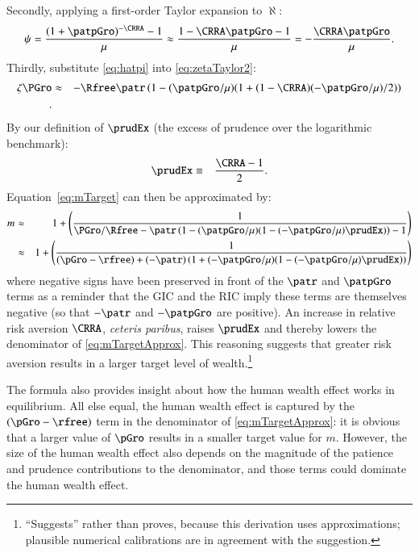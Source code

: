Secondly, applying a first-order Taylor expansion to $\aleph$:
\begin{eqnarray}
\label{eq:hatpi}
\aleph = \frac{(1+\patpGro)^{-\CRRA}-1}{\urate} 
\approx \frac{1- \CRRA \patpGro-1}{\urate}
= -\frac{\CRRA \patpGro}{\urate}
.
\end{eqnarray}
Thirdly, substitute \eqref{eq:hatpi} into \eqref{eq:zetaTaylor2}:
\begin{eqnarray}
  \zeta\PGro 
& \approx &  
-\Rfree \patr \left(1-(\patpGro/\urate)(1+(1-\CRRA)(-\patpGro/\urate)/2)\right)\\ 
\label{eq:zetaGammaApprox}
.
\end{eqnarray}
By our definition of $\prudEx$ (the excess of prudence over the logarithmic benchmark):
\begin{eqnarray}
  \prudEx & \equiv & \frac{\CRRA-1}{2}%
.   \notag
\end{eqnarray}
Equation~\eqref{eq:mTarget} can then be approximated by:
\begin{eqnarray}
 \mTarg^{\null} & \approx & 1 + \left(\frac{1}{\PGro/\Rfree-\patr \left(1-(\patpGro/\urate)(1-(-\patpGro/\urate)\prudEx) \right)-1}\right) \notag
\\ & \approx & 1 + \left(\frac{1}{(\pGro-\rfree)+(-\patr) \left(1+(-\patpGro/\urate)(1-(-\patpGro/\urate)\prudEx)\right)}\right)
\label{eq:mTargetApprox}
\end{eqnarray}
where negative signs have been preserved in front of the $\patr$ and $\patpGro$ terms as a reminder that
the GIC and the RIC imply these terms are themselves negative (so that $-\patr$ and $-\patpGro$ are positive).
An increase in relative risk aversion $\CRRA$, \textit{ceteris paribus}, raises $\prudEx$ and thereby lowers the denominator of \eqref{eq:mTargetApprox}.  This reasoning suggests that
greater risk aversion results in a larger target level of wealth.\footnote{``Suggests'' rather than proves, because
this derivation uses approximations; plausible numerical calibrations are in agreement with the suggestion.}

The formula also provides insight about how the human wealth effect
works in equilibrium.  All else equal, the human wealth effect is captured
by the $(\pGro-\rfree)$ term in the denominator of \eqref{eq:mTargetApprox}:
it is obvious that a larger value of $\pGro$ results in a smaller
target value for $m$.  However, the size of the human wealth
effect also depends on the magnitude of the patience and prudence contributions to the denominator, and those terms could dominate the human wealth effect.  

